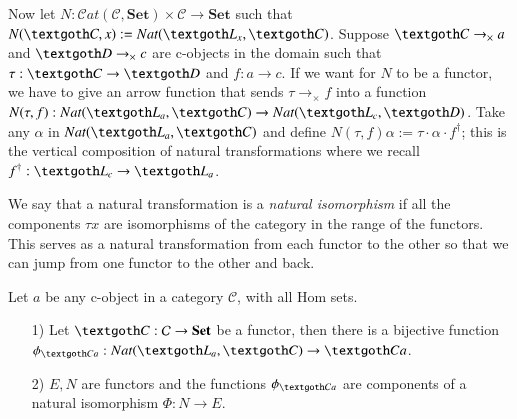 \documentclass [12pt]{book}
\begin{document}
Now let $N:\mathcal Cat(\mathcal C,\textbf{Set})\times\mathcal C\rightarrow\textbf{Set}$ such that $N(\textgoth C,x):=Nat(\textgoth L_x,\textgoth C)$. Suppose $\textgoth C\rightarrow_\times a$ and $\textgoth D\rightarrow_\times c$ are c-objects in the domain such that $\tau:\textgoth C\rightarrow\textgoth D$ and $f:a\rightarrow c$. If we want for $N$ to be a functor, we have to give an arrow function that sends $\tau\rightarrow_\times f$ into a function $N(\tau,f):Nat(\textgoth L_a,\textgoth C)\rightarrow Nat(\textgoth L_c,\textgoth D)$. Take any $\alpha$ in $Nat(\textgoth L_a,\textgoth C)$ and define $N(\tau,f)\alpha:=\tau\cdot\alpha\cdot f^\dagger$; this is the vertical composition of natural transformations where we recall $f^\dagger:\textgoth L_c\rightarrow\textgoth L_a$.

We say that a natural transformation is a \textit{natural isomorphism} if all the components $\tau x$ are isomorphisms of the category in the range of the functors. This serves as a natural transformation from each functor to the other so that we can jump from one functor to the other and back.

\begin{Y Lemma}Let $a$ be any c-object in a category $\mathcal C$, with all Hom sets.\begin{itemize}\item[1)]Let $\textgoth C:\mathcal C\rightarrow\textbf{Set}$ be a functor, then there is a bijective function $\phi_{\textgoth Ca}:Nat(\textgoth L_a,\textgoth C)\rightarrow\textgoth Ca$.\item[2)]$E,N$ are functors and the functions $\phi_{\textgoth Ca}$ are components of a natural isomorphism $\Phi:N\rightarrow E$.\end{itemize}\end{Y Lemma}
\end{document}
